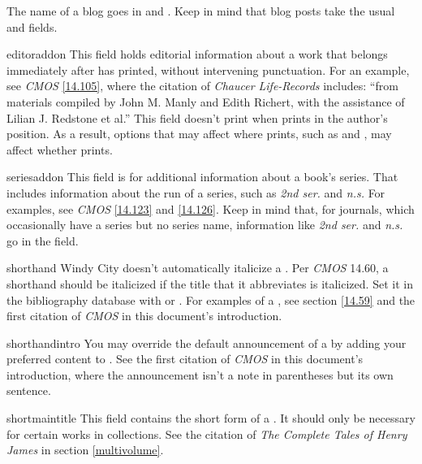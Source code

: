 \documentclass[11pt,letterpaper,oneside]{article}
\begin{document}
\begin{marglist}

\item[\smash{\tshortstack[l]{blogtitle\\blogsubtitle}}] The name of a
blog goes in  and . Keep in
mind that blog posts take the usual  and
 fields.

\item[editoraddon] This field holds editorial information about a work
that belongs immediately after  has printed, without
intervening punctuation. For an example, see \textit{CMOS}
\ref{14.105}, where the citation of \textit{Chaucer Life-Records}
includes: ``from materials compiled by John M. Manly and Edith
Richert, with the assistance of Lilian J. Redstone et al.'' This field
doesn't print when  prints in the author's position.
As a result, options that may affect where  prints,
such as  and , may affect whether
 prints.

\item[seriesaddon] This field is for additional information about a
book's series. That includes information about the run of a series,
such as \textit{2nd ser.} and \textit{n.s.} For examples, see
\textit{CMOS} \ref{14.123} and \ref{14.126}. Keep in mind that, for
journals, which occasionally have a series but no series name,
information like \textit{2nd ser.} and \textit{n.s.} go in the
 field.

\item[shorthand] Windy City doesn't automatically italicize a
. Per \textit{CMOS} 14.60, a shorthand should be
italicized if the title that it abbreviates is italicized. Set it in
the bibliography database with  or . For
examples of a , see section \ref{14.59} and the
first citation of \textit{CMOS} in this document's introduction.

\item[shorthandintro] You may override the default announcement of a
 by adding your preferred content to
. See the first citation of \textit{CMOS} in
this document's introduction, where the announcement isn't a note in
parentheses but its own sentence.

\item[shortmaintitle] This field contains the short form of a
. It should only be necessary for certain works in
collections. See the citation of \textit{The Complete Tales of Henry
James} in section \ref{multivolume}.

\end{marglist}
\end{document}
